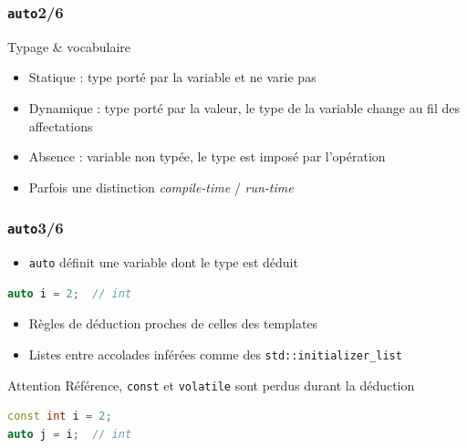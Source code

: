 \documentclass[C++.tex]{subfiles}
\begin{document}
\begin{frame}[fragile]
	\frametitle{\lstinline|auto|\titlehfill{}2/6}
	\begin{block}{Typage \& vocabulaire}
		\begin{itemize}
			\item Statique : type porté par la variable et ne varie pas
			\item Dynamique : type porté par la valeur, le type de la variable change au fil des affectations
			\item Absence : variable non typée, le type est imposé par l'opération
			\item Parfois une distinction \textit{compile-time} / \textit{run-time}

		\end{itemize}
	\end{block}
\end{frame}

\begin{frame}[fragile]
	\frametitle{\lstinline|auto|\titlehfill{}3/6}
	\begin{itemize}
		\item \lstinline|auto| définit une variable dont le type est déduit
	\end{itemize}

	\begin{lstlisting}[language=C++]
auto i = 2;  // int\end{lstlisting}

	\begin{itemize}
		\item Règles de déduction proches de celles des templates
		\item Listes entre accolades inférées comme des \lstinline|std::initializer_list|
	\end{itemize}

	\begin{alertblock}{Attention}
		Référence, \lstinline|const| et \lstinline|volatile| sont perdus durant la déduction

		\begin{lstlisting}[language=C++]
const int i = 2;
auto j = i;  // int \end{lstlisting}
	\end{alertblock}
\end{frame}
\end{document}
